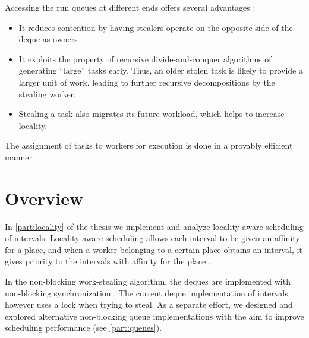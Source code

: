 Accessing the run queues at different ends offers several advantages
\cite{Frigo1998}:

\begin{itemize}
\item It reduces contention by having stealers operate on the opposite
  side of the deque as owners
\item It exploits the property of recursive divide-and-conquer
  algorithms of generating ``large'' tasks early. Thus, an older
  stolen task is likely to provide a larger unit of work, leading to
  further recursive decompositions by the stealing worker.
\item Stealing a task also migrates its future workload, which helps
  to increase locality.
\end{itemize}

The assignment of tasks to workers for execution is done in a provably
efficient manner \cite{Blumofe1995, Blumofe1999}.


\section{Overview}
\label{sec:intro-overview}

In \autoref{part:locality} of the thesis we implement and analyze
locality-aware scheduling of intervals. Locality-aware scheduling
allows each interval to be given an affinity for a place, and when a
worker belonging to a certain place obtains an interval, it gives
priority to the intervals with affinity for the place \cite{Acar2002,
  Guo2010}.

In the non-blocking work-stealing algorithm, the deques are
implemented with non-blocking synchronization \cite{Arora2001}. The
current deque implementation of intervals however uses a lock when
trying to steal. As a separate effort, we designed and explored
alternative non-blocking queue implementations with the aim to improve
scheduling performance (see \autoref{part:queues}).





